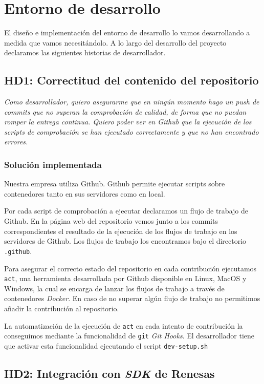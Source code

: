 \section{Entorno de desarrollo}

El diseño e implementación del entorno de desarrollo lo
vamos desarrollando a medida que vamos necesitándolo.
A lo largo del desarrollo del proyecto declaramos las
siguientes historias de desarrollador.

\subsection{HD1: Correctitud del contenido del repositorio}

\textit{Como desarrollador, quiero asegurarme que en ningún
momento hago un push de commits que no superan
la comprobación de calidad, de forma que no puedan
romper la entrega continua. Quiero poder ver en Github
que la ejecución de los scripts de comprobación se han
ejecutado correctamente y que no han encontrado errores.}

\subsubsection{Solución implementada}

Nuestra empresa utiliza Github. Github permite ejecutar
scripts sobre contenedores tanto en sus servidores como
en local.

Por cada script de comprobación a ejecutar declaramos
un flujo de trabajo de Github. En la página web del
repositorio vemos junto a los commits correspondientes
el resultado de la ejecución de los flujos de trabajo
en los servidores de Github.
Los flujos de trabajo los encontramos bajo el directorio
\texttt{.github}.

Para asegurar el correcto estado del repositorio en cada
contribución ejecutamos \texttt{act}, una herramienta
desarrollada por Github disponible en Linux, MacOS y Windows,
la cual se encarga de lanzar los flujos de trabajo
a través de contenedores \textit{Docker}. En caso de
no superar algún flujo de trabajo no permitimos añadir
la contribución al repositorio.

La automatización de la ejecución de \texttt{act} en cada
intento de contribución la conseguimos mediante la funcionalidad
de \texttt{git} \textit{Git Hooks}. El desarrollador tiene
que activar esta funcionalidad ejecutando el script \texttt{dev-setup.sh}

\subsection{HD2: Integración con \textit{SDK} de Renesas}

